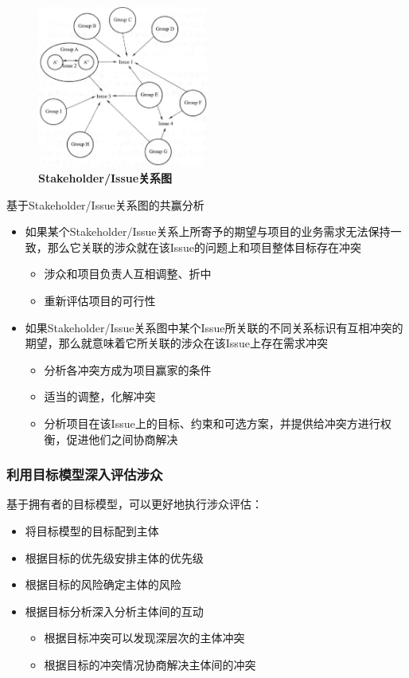 \begin{figure}[H]
	\centering
	\includegraphics[width=0.5\textwidth]{img/Stakeholder-Issue关系图.png}
    \caption*{\textbf{Stakeholder/Issue关系图}}
    \vspace{-1em}
\end{figure}

基于Stakeholder/Issue关系图的共赢分析
\begin{itemize}
    \item 如果某个Stakeholder/Issue关系上所寄予的期望与项目的业务需求无法保持一致，那么它关联的涉众就在该Issue的问题上和项目整体目标存在冲突
    \begin{itemize}
        \item 涉众和项目负责人互相调整、折中 
        \item 重新评估项目的可行性 
    \end{itemize}
    \item 如果Stakeholder/Issue关系图中某个Issue所关联的不同关系标识有互相冲突的期望，那么就意味着它所关联的涉众在该Issue上存在需求冲突
    \begin{itemize}
        \item 分析各冲突方成为项目赢家的条件 
        \item 适当的调整，化解冲突 
        \item 分析项目在该Issue上的目标、约束和可选方案，并提供给冲突方进行权衡，促进他们之间协商解决   
    \end{itemize}
\end{itemize}

\subsubsection{利用目标模型深入评估涉众}
基于拥有者的目标模型，可以更好地执行涉众评估：
\begin{itemize}
    \item 将目标模型的目标配到主体
    \item 根据目标的优先级安排主体的优先级
    \item 根据目标的风险确定主体的风险
    \item 根据目标分析深入分析主体间的互动
    \begin{itemize}
        \item 根据目标冲突可以发现深层次的主体冲突
        \item 根据目标的冲突情况协商解决主体间的冲突
    \end{itemize}
\end{itemize}

